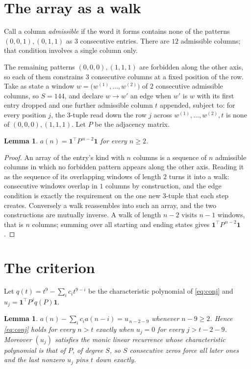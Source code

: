\documentclass[11pt,a4paper]{article}
\theoremstyle{plain}
\newtheorem{lemma}[theorem]{Lemma}
\theoremstyle{definition}
\begin{document}
\section{The array as a walk}

Call a column \emph{admissible} if the word it forms contains none of the patterns
$(0,0,1), (0,1,1)$ as $3$ consecutive entries. There are $12$ admissible columns; that condition
involves a single column only.

The remaining patterns $(0,0,0), (1,1,1)$ are forbidden along the other axis, so each of them
constrains $3$ consecutive columns at a fixed position of the row. Take as state a
window $w=\bigl(w^{(1)},\dots,w^{(2)}\bigr)$ of $2$ consecutive admissible
columns, so $S=144$, and declare $w\to w'$ an edge when $w'$ is $w$ with its first entry
dropped and one further admissible column $t$ appended, subject to: for every position
$j$, the $3$-tuple read down the row $j$ across $w^{(1)},\dots,w^{(2)},t$
is none of $(0,0,0), (1,1,1)$. Let $P$ be the adjacency matrix.

\begin{lemma}\label{lem:walk}
$a(n)=\mathbf{1}^{\!\top}P^{\,n-2}\mathbf{1}$ for every $n\ge2$.
\end{lemma}

\begin{proof}
An array of the entry's kind with $n$ columns is a sequence of $n$ admissible columns in
which no forbidden pattern appears along the other axis. Reading it as the sequence of its
overlapping windows of length $2$ turns it into a walk: consecutive windows overlap in
$1$ columns by construction, and the edge condition is exactly the requirement on the one
new $3$-tuple that each step creates. Conversely a walk reassembles into such an array,
and the two constructions are mutually inverse. A walk of length $n-2$ visits $n-1$
windows, that is $n$ columns; summing over all starting and ending states gives
$\mathbf{1}^{\!\top}P^{\,n-2}\mathbf{1}$.
\end{proof}

\section{The criterion}

Let $q(t)=t^{9}-\sum_i c_i t^{9-i}$ be the characteristic polynomial of
\eqref{eq:conj} and $u_j=\mathbf{1}^{\!\top}P^{j}q(P)\mathbf{1}$.

\begin{lemma}\label{lem:crit}
$a(n)-\sum_i c_i a(n-i)=u_{\,n-2-9}$ whenever $n-9\ge2$. Hence
\eqref{eq:conj} holds for every $n>t$ exactly when $u_j=0$ for every
$j>t-2-9$. Moreover $(u_j)$ satisfies the monic linear recurrence whose
characteristic polynomial is that of $P$, of degree $S$, so $S$ consecutive zeros force all
later ones and the last nonzero $u_j$ pins $t$ down exactly.
\end{lemma}
\end{document}

